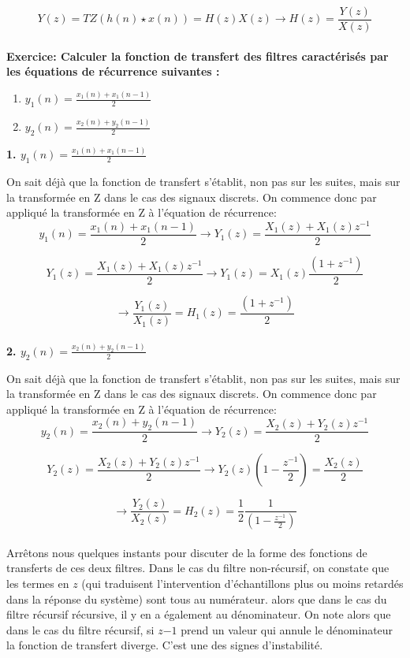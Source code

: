 \documentclass[11pt,a4paper]{article}
\begin{document}
\[ Y(z) = TZ(h(n)\star x(n)) =  H(z) X(z) \rightarrow  H(z) = \frac{Y(z)}{X(z)}\]\\ 

\textbf{Exercice: Calculer la fonction de transfert des filtres caractérisés par les équations de récurrence suivantes :}\\
\begin{enumerate}
\item  $y_1(n) = \frac{x_1(n) + x_1(n-1)}{2}$
\item  $y_2(n) = \frac{x_2(n) + y_2(n-1)}{2}$
\end{enumerate}


\textbf{1. $y_1(n) = \frac{x_1(n) + x_1(n-1)}{2}$}


On sait déjà que la fonction de transfert s'établit, non pas sur les suites, mais sur la transformée en Z dans le cas des signaux discrets. On commence donc par appliqué la transformée en Z à l'équation de récurrence:\\

\[ y_1(n) = \frac{x_1(n) + x_1(n-1)}{2} \rightarrow Y_1(z) = \frac{X_1(z) + X_1(z)z^{-1}}{2} \]

\[ Y_1(z) = \frac{X_1(z) + X_1(z)z^{-1}}{2} \rightarrow Y_1(z) = X_1(z)\frac{(1 + z^{-1})}{2}  \]

\[  \rightarrow \frac{Y_1(z)}{X_1(z)} = H_1(z) = \frac{(1 + z^{-1})}{2}  \]\\

\textbf{2. $y_2(n) = \frac{x_2(n) + y_2(n-1)}{2}$}


On sait déjà que la fonction de transfert s'établit, non pas sur les suites, mais sur la transformée en Z dans le cas des signaux discrets. On commence donc par appliqué la transformée en Z à l'équation de récurrence:\\

\[ y_2(n) = \frac{x_2(n) + y_2(n-1)}{2} \rightarrow Y_2(z) = \frac{X_2(z) + Y_2(z)z^{-1}}{2} \]

\[ Y_2(z) = \frac{X_2(z) + Y_2(z)z^{-1}}{2} \rightarrow Y_2(z)(1-\frac{z^{-1}}{2}) = \frac{X_2(z)}{2}  \]

\[  \rightarrow \frac{Y_2(z)}{X_2(z)} = H_2(z) = \frac{1}{2}\frac{1}{(1 - \frac{z^{-1}}{2})}  \]\\


Arrêtons nous quelques instants pour discuter de la forme des fonctions de transferts de ces deux filtres. Dans le cas du filtre non-récursif, on constate que les termes en $z$ (qui traduisent l'intervention d'échantillons plus ou moins retardés dans la réponse du système) sont tous au numérateur. alors que dans le cas du filtre récursif récursive, il y en a également au dénominateur. On note alors que dans le cas du filtre récursif, si $z{-1}$ prend un valeur qui annule le dénominateur la fonction de transfert diverge. C'est une des signes d'instabilité. 
\end{document}
